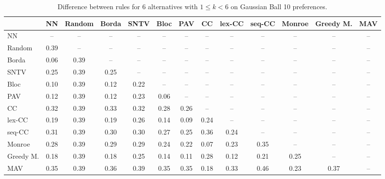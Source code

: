 
\begin{table*}[h!]
\centering
\begin{tabular}{lcccccccccccc}
\toprule
 & NN & Random & Borda & SNTV & Bloc & PAV & CC & lex-CC & seq-CC & Monroe & Greedy M. & MAV \\
\midrule
NN & -- & -- & -- & -- & -- & -- & -- & -- & -- & -- & -- & -- \\
Random & 0.39 & -- & -- & -- & -- & -- & -- & -- & -- & -- & -- & -- \\
Borda & 0.06 & 0.39 & -- & -- & -- & -- & -- & -- & -- & -- & -- & -- \\
SNTV & 0.25 & 0.39 & 0.25 & -- & -- & -- & -- & -- & -- & -- & -- & -- \\
Bloc & 0.10 & 0.39 & 0.12 & 0.22 & -- & -- & -- & -- & -- & -- & -- & -- \\
PAV & 0.12 & 0.39 & 0.12 & 0.23 & 0.06 & -- & -- & -- & -- & -- & -- & -- \\
CC & 0.32 & 0.39 & 0.33 & 0.32 & 0.28 & 0.26 & -- & -- & -- & -- & -- & -- \\
lex-CC & 0.19 & 0.39 & 0.19 & 0.26 & 0.14 & 0.09 & 0.24 & -- & -- & -- & -- & -- \\
seq-CC & 0.31 & 0.39 & 0.30 & 0.30 & 0.27 & 0.25 & 0.36 & 0.24 & -- & -- & -- & -- \\
Monroe & 0.28 & 0.39 & 0.29 & 0.29 & 0.24 & 0.22 & 0.07 & 0.23 & 0.35 & -- & -- & -- \\
Greedy M. & 0.18 & 0.39 & 0.18 & 0.25 & 0.14 & 0.11 & 0.28 & 0.12 & 0.21 & 0.25 & -- & -- \\
MAV & 0.35 & 0.39 & 0.36 & 0.39 & 0.35 & 0.35 & 0.18 & 0.33 & 0.46 & 0.23 & 0.37 & -- \\
\bottomrule
\end{tabular}

\caption{Difference between rules for 6 alternatives with $1 \leq k < 6$ on Gaussian Ball 10 preferences.}
\end{table*}
